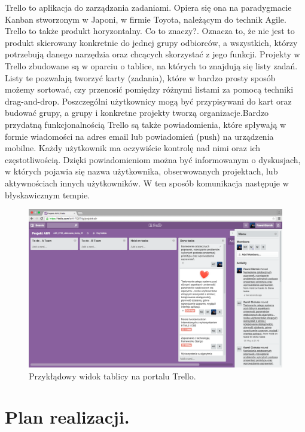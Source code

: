 \documentclass[a4paper,12pt]{article}		%
\begin{document}
Trello to aplikacja do zarządzania zadaniami. Opiera się ona na paradygmacie Kanban stworzonym w Japoni, w firmie Toyota, należącym do technik Agile. Trello to także produkt horyzontalny. Co to znaczy?. Oznacza to, że nie jest to produkt skierowany konkretnie do jednej grupy odbiorców, a wszystkich, którzy potrzebują danego narzędzia oraz chcących skorzystać z jego funkcji. Projekty w Trello zbudowane są w oparciu o tablice, na których to znajdują się listy zadań. Listy te pozwalają tworzyć karty (zadania), które w bardzo prosty sposób możemy sortować, czy przenosić pomiędzy różnymi listami za pomocą techniki drag-and-drop. Poszczególni użytkownicy mogą być przypisywani do kart oraz budować grupy, a grupy i konkretne projekty tworzą organizacje.Bardzo przydatną funkcjonalnością Trello są także powiadomienia, które spływają w formie wiadomości na adres email lub powiadomień (push) na urządzenia mobilne. Każdy użytkownik ma oczywiście kontrolę nad nimi oraz ich częstotliwością. Dzięki powiadomieniom można być informowanym o dyskusjach, w których pojawia się nazwa użytkownika, obserwowanych projektach, lub aktywnościach innych użytkowników. W ten sposób komunikacja następuje w błyskawicznym tempie.

\begin{figure}[h!]
\centering
\includegraphics[scale=0.2]{Resources/Trello_Zrzut.png}
\caption{Przykłądowy widok tablicy na portalu Trello.} 
\end{figure} 

\section{Plan realizacji.}
\end{document}
